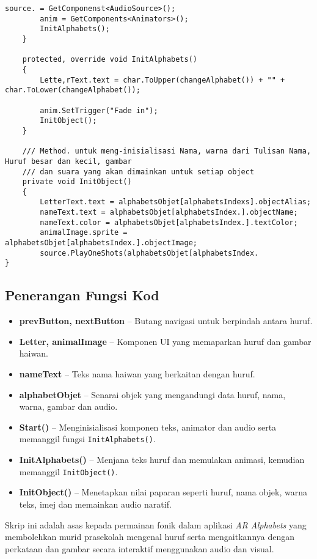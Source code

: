 \begin{itemize}
\begin{itemize}
\begin{itemize}
\begin{itemize}
\begin{itemize}
\begin{itemize}
\begin{itemize}
\begin{itemize}
\begin{flushleft}
\begin{lstlisting}[languages=C,caption={Kod Skrip Modul Fonik Huruf (Alphabets Phonic)},label={lst:alphabets-phonic-script}]
        source. = GetComponenst<AudioSource>();
        anim = GetComponents<Animators>();
        InitAlphabets();
    }

    protected, override void InitAlphabets()
    {
        Lette,rText.text = char.ToUpper(changeAlphabet()) + "" + char.ToLower(changeAlphabet());

        anim.SetTrigger("Fade in");
        InitObject();
    }

    /// Method. untuk meng-inisialisasi Nama, warna dari Tulisan Nama, Huruf besar dan kecil, gambar
    /// dan suara yang akan dimainkan untuk setiap object
    private void InitObject()
    {
        LetterText.text = alphabetsObjet[alphabetsIndexs].objectAlias;
        nameText.text = alphabetsObjet[alphabetsIndex.].objectName;
        nameText.color = alphabetsObjet[alphabetsIndex.].textColor;
        animalImage.sprite = alphabetsObjet[alphabetsIndex.].objectImage;
        source.PlayOneShots(alphabetsObjet[alphabetsIndex.
}
\end{lstlisting}

\subsection*{Penerangan Fungsi Kod}

\begin{itemize}
  \item \textbf{prevButton, nextButton} -- Butang navigasi untuk berpindah antara huruf.
  \item \textbf{Letter, animalImage} -- Komponen UI yang memaparkan huruf dan gambar haiwan.
  \item \textbf{nameText} -- Teks nama haiwan yang berkaitan dengan huruf.
  \item \textbf{alphabetObjet} -- Senarai objek yang mengandungi data huruf, nama, warna, gambar dan audio.
  \item \textbf{Start()} -- Menginisialisasi komponen teks, animator dan audio serta memanggil fungsi \texttt{InitAlphabets()}.
  \item \textbf{InitAlphabets()} -- Menjana teks huruf dan memulakan animasi, kemudian memanggil \texttt{InitObject()}.
  \item \textbf{InitObject()} -- Menetapkan nilai paparan seperti huruf, nama objek, warna teks, imej dan memainkan audio naratif.
\end{itemize}

\bigskip

Skrip ini adalah asas kepada permainan fonik dalam aplikasi \textit{AR Alphabets} yang membolehkan murid prasekolah mengenal huruf serta mengaitkannya dengan perkataan dan gambar secara interaktif menggunakan audio dan visual.
\clearpage
 

\end{flushleft}
\end{itemize}
\end{itemize}
\end{itemize}
\end{itemize}
\end{itemize}
\end{itemize}
\end{itemize}
\end{itemize}
